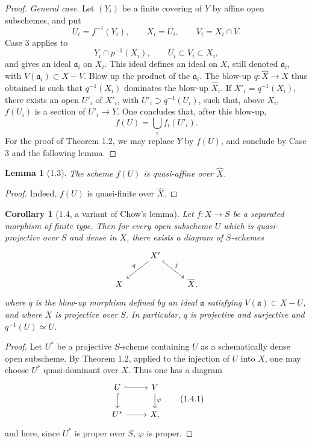 \documentclass[11pt]{article}
\newtheorem*{lemma}{Lemma}
\newtheorem*{corollary}{Corollary}
\newcommand{\wh}[1]{\widehat{#1}}
\begin{document}
\begin{proof}
\emph{General case.} Let \((Y_i)\) be a finite covering of \(Y\) by affine open subschemes, and put
\[
U_i=f^{-1}(Y_i),\qquad X_i=\overline{U_i},\qquad V_i=X_i\cap V.
\]
Case 3 applies to
\[
Y_i\cap p^{-1}(X_i),\qquad U_i\subset V_i\subset X_i,
\]
and gives an ideal \(\mathfrak a_i\) on \(X_i\). This ideal defines an ideal on \(X\), still denoted \(\mathfrak a_i\), with \(V(\mathfrak a_i)\subset X-V\). Blow up the product of the \(\mathfrak a_i\). The blow-up \(q:\wh X\to X\) thus obtained is such that \(q^{-1}(X_i)\) dominates the blow-up \(\wh X_i\). If \(X'_i=q^{-1}(X_i)\), there exists an open \(U'_i\) of \(X'_i\), with \(U'_i\supset q^{-1}(U_i)\), such that, above \(X_i\), \(f(U_i)\) is a section of \(U'_i\to Y\). One concludes that, after this blow-up,
\[
f(U)=\bigcup_i f_i(U'_i).
\]
For the proof of Theorem 1.2, we may replace \(Y\) by \(f(U)\), and conclude by Case 3 and the following lemma.
\end{proof}

\begin{lemma}[1.3]
The scheme \(f(U)\) is quasi-affine over \(\wh X\).
\end{lemma}

\begin{proof}
Indeed, \(f(U)\) is quasi-finite over \(\wh X\).
\end{proof}

\begin{corollary}[1.4, a variant of Chow's lemma]
Let \(f:X\to S\) be a separated morphism of finite type. Then for every open subscheme \(U\) which is quasi-projective over \(S\) and dense in \(X\), there exists a diagram of \(S\)-schemes
\[
\begin{tikzcd}
& X' \ar[dl,"q"'] \ar[dr,hook,"j"] & \\
X && \overline X,
\end{tikzcd}
\]
where \(q\) is the blow-up morphism defined by an ideal \(\mathfrak a\) satisfying \(V(\mathfrak a)\subset X-U\), and where \(\overline X\) is projective over \(S\). In particular, \(q\) is projective and surjective and \(q^{-1}(U)\simeq U\).
\end{corollary}

\begin{proof}
Let \(U^*\) be a projective \(S\)-scheme containing \(U\) as a schematically dense open subscheme. By Theorem 1.2, applied to the injection of \(U\) into \(X\), one may choose \(U^*\) quasi-dominant over \(X\). Thus one has a diagram
\[
\begin{tikzcd}
U \ar[r,hook] \ar[d,hook] & V \ar[d,"\varphi"] \\
U^* \ar[r] & X,
\end{tikzcd}
\tag{1.4.1}
\]
and here, since \(U^*\) is proper over \(S\), \(\varphi\) is proper.
\end{proof}
\end{document}
